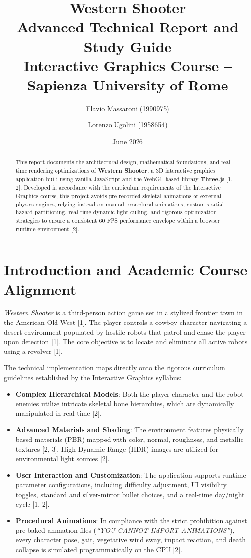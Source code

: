 \documentclass[11pt,a4paper,oneside]{article}
\title{
    \textbf{Western Shooter}\\
    \large Advanced Technical Report and Study Guide\\
    \small Interactive Graphics Course -- Sapienza University of Rome
}
\author{Flavio Massaroni (1990975) \and Lorenzo Ugolini (1958654)}
\date{June 2026}
\begin{document}
\maketitle

\begin{abstract}
This report documents the architectural design, mathematical foundations, and real-time rendering optimizations of \textbf{Western Shooter}, a 3D interactive graphics application built using vanilla JavaScript and the WebGL-based library \textbf{Three.js} [1, 2]. Developed in accordance with the curriculum requirements of the Interactive Graphics course, this project avoids pre-recorded skeletal animations or external physics engines, relying instead on manual procedural animations, custom spatial hazard partitioning, real-time dynamic light culling, and rigorous optimization strategies to ensure a consistent 60 FPS performance envelope within a browser runtime environment [2].
\end{abstract}

\tableofcontents
\newpage

\section{Introduction and Academic Course Alignment}
\emph{Western Shooter} is a third-person action game set in a stylized frontier town in the American Old West [1]. The player controls a cowboy character navigating a desert environment populated by hostile robots that patrol and chase the player upon detection [1]. The core objective is to locate and eliminate all active robots using a revolver [1].

The technical implementation maps directly onto the rigorous curriculum guidelines established by the Interactive Graphics syllabus:
\begin{itemize}
    \item \textbf{Complex Hierarchical Models}: Both the player character and the robot enemies utilize intricate skeletal bone hierarchies, which are dynamically manipulated in real-time [2].
    \item \textbf{Advanced Materials and Shading}: The environment features physically based materials (PBR) mapped with color, normal, roughness, and metallic textures [2, 3]. High Dynamic Range (HDR) images are utilized for environmental light sources [2].
    \item \textbf{User Interaction and Customization}: The application supports runtime parameter configurations, including difficulty adjustment, UI visibility toggles, standard and silver-mirror bullet choices, and a real-time day/night cycle [1, 2].
    \item \textbf{Procedural Animations}: In compliance with the strict prohibition against pre-baked animation files (\emph{``YOU CANNOT IMPORT ANIMATIONS''}), every character pose, gait, vegetative wind sway, impact reaction, and death collapse is simulated programmatically on the CPU [2].
\end{itemize}
\end{document}
